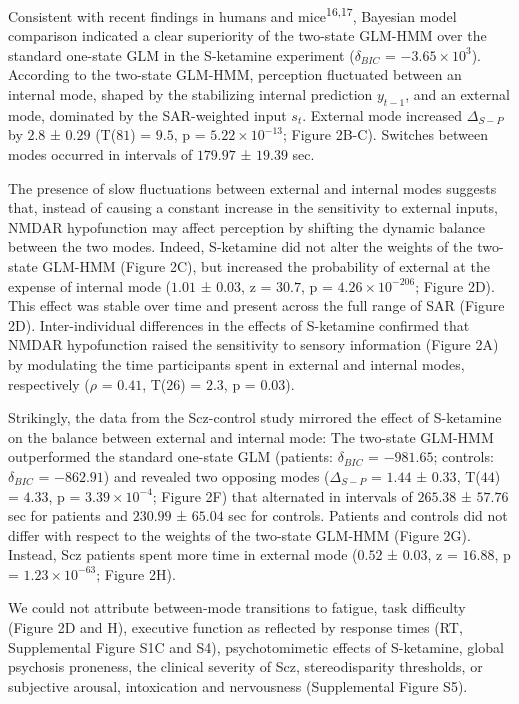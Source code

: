 \documentclass[
]{article}
\begin{document}
Consistent with recent findings in humans and
mice\textsuperscript{16,17}, Bayesian model comparison indicated a clear
superiority of the two-state GLM-HMM over the standard one-state GLM in
the S-ketamine experiment (\(\delta_{BIC}\) =
\(\ensuremath{-3.65\times 10^{3}}\)). According to the two-state
GLM-HMM, perception fluctuated between an internal mode, shaped by the
stabilizing internal prediction \(y_{t-1}\), and an external mode,
dominated by the SAR-weighted input \(s_t\). External mode increased
\(\Delta_{S-P}\) by \(2.8\) ± \(0.29\) (T(\(81\)) = \(9.5\), p =
\(\ensuremath{5.22\times 10^{-13}}\); Figure 2B-C). Switches between
modes occurred in intervals of \(179.97\) ± \(19.39\) sec.~

The presence of slow fluctuations between external and internal modes
suggests that, instead of causing a constant increase in the sensitivity
to external inputs, NMDAR hypofunction may affect perception by shifting
the dynamic balance between the two modes. Indeed, S-ketamine did not
alter the weights of the two-state GLM-HMM (Figure 2C), but increased
the probability of external at the expense of internal mode (\(1.01\) ±
\(0.03\), z = \(30.7\), p = \(\ensuremath{4.26\times 10^{-206}}\);
Figure 2D). This effect was stable over time and present across the full
range of SAR (Figure 2D). Inter-individual differences in the effects of
S-ketamine confirmed that NMDAR hypofunction raised the sensitivity to
sensory information (Figure 2A) by modulating the time participants
spent in external and internal modes, respectively (\(\rho\) = \(0.41\),
T(\(26\)) = \(2.3\), p = \(0.03\)).

Strikingly, the data from the Scz-control study mirrored the effect of
S-ketamine on the balance between external and internal mode: The
two-state GLM-HMM outperformed the standard one-state GLM (patients:
\(\delta_{BIC}\) = \(-981.65\); controls: \(\delta_{BIC}\) =
\(-862.91\)) and revealed two opposing modes (\(\Delta_{S-P}\) =
\(1.44\) ± \(0.33\), T(\(44\)) = \(4.33\), p =
\(\ensuremath{3.39\times 10^{-4}}\); Figure 2F) that alternated in
intervals of \(265.38\) ± \(57.76\) sec for patients and \(230.99\) ±
\(65.04\) sec for controls. Patients and controls did not differ with
respect to the weights of the two-state GLM-HMM (Figure 2G). Instead,
Scz patients spent more time in external mode (\(0.52\) ± \(0.03\), z =
\(16.88\), p = \(\ensuremath{1.23\times 10^{-63}}\); Figure 2H).

We could not attribute between-mode transitions to fatigue, task
difficulty (Figure 2D and H), executive function as reflected by
response times (RT, Supplemental Figure S1C and S4), psychotomimetic
effects of S-ketamine, global psychosis proneness, the clinical severity
of Scz, stereodisparity thresholds, or subjective arousal, intoxication
and nervousness (Supplemental Figure S5).
\end{document}
